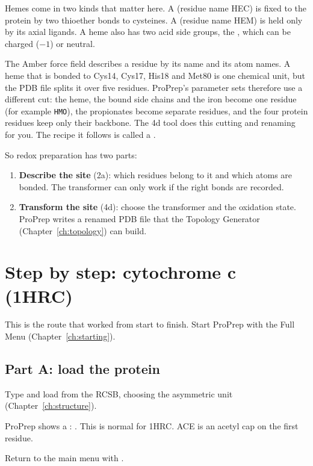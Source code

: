 Hemes come in two kinds that matter here. A  (residue name
HEC) is fixed to the protein by two thioether bonds to cysteines. A
 (residue name HEM) is held only by its axial ligands. A heme
also has two acid side groups, the , which can be charged
($-1$) or neutral.

\begin{behindscenes}
The Amber force field describes a residue by its name and its atom names.
A heme that is bonded to Cys14, Cys17, His18 and Met80 is one chemical unit,
but the PDB file splits it over five residues. ProPrep's parameter sets
therefore use a different cut: the heme, the bound side chains and the iron
become one residue (for example \texttt{HMO}), the propionates become separate
residues, and the four protein residues keep only their backbone. The 4d
tool does this cutting and renaming for you. The recipe it follows is called a
.
\end{behindscenes}

So redox preparation has two parts:
\begin{enumerate}
  \item \textbf{Describe the site} (2a): which residues belong to it and which
        atoms are bonded. The transformer can only work if the right bonds are
        recorded.
  \item \textbf{Transform the site} (4d): choose the transformer and the
        oxidation state. ProPrep writes a renamed PDB file that the Topology
        Generator (Chapter~\ref{ch:topology}) can build.
\end{enumerate}

\section{Step by step: cytochrome c (1HRC)}
\label{sec:redox-1hrc}

This is the route that worked from start to finish. Start ProPrep with the
Full Menu (Chapter~\ref{ch:starting}).

\subsection*{Part A: load the protein}

\begin{steps}
  \item Type  and load  from the RCSB, choosing the
        asymmetric unit (Chapter~\ref{ch:structure}).
  \item ProPrep shows a :
        . This is normal for 1HRC.
        ACE is an acetyl cap on the first residue.
  \item Return to the main menu with .
\end{steps}

